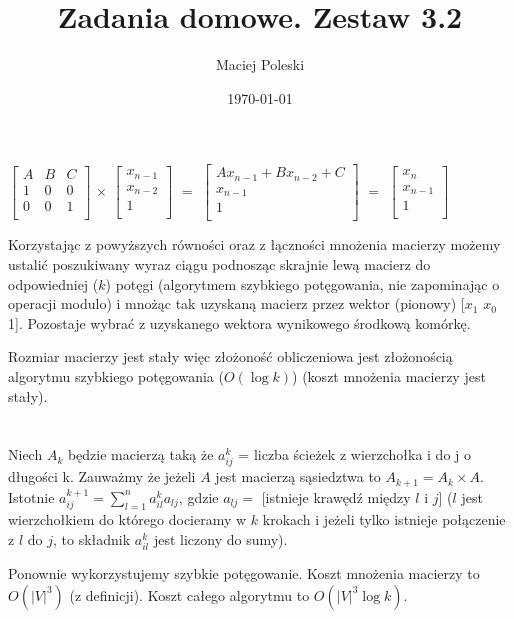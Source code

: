 \documentclass[a4paper,12pt]{article}
\title{Zadania domowe. Zestaw 3.2}
\author{Maciej Poleski}
\date{\today}
\begin{document}
\maketitle

\newpage

\section{}
$
\begin{bmatrix}
 A & B & C \\
 1 & 0 & 0 \\
 0 & 0 & 1 \\
\end{bmatrix}
$
$\times$
$
\begin{bmatrix}
 x_{n-1} \\
 x_{n-2} \\
 1 \\
\end{bmatrix}
$
$=$
$
\begin{bmatrix}
 Ax_{n-1}+Bx_{n-2}+C \\
 x_{n-1} \\
 1 \\
\end{bmatrix}
$
$=$
$
\begin{bmatrix}
 x_{n} \\
 x_{n-1} \\
 1 \\
\end{bmatrix}
$


Korzystając z powyższych równości oraz z łączności mnożenia macierzy możemy ustalić poszukiwany wyraz ciągu podnosząc skrajnie lewą macierz do odpowiedniej ($k$) potęgi (algorytmem szybkiego potęgowania, nie zapominając o operacji modulo) i mnożąc tak uzyskaną macierz przez wektor (pionowy) [$x_1$ $x_0$ 1]. Pozostaje wybrać z uzyskanego wektora wynikowego środkową komórkę.

Rozmiar macierzy jest stały więc złożoność obliczeniowa jest złożonością algorytmu szybkiego potęgowania ($O(\log{k})$) (koszt mnożenia macierzy jest stały).

\section{}
Niech $A_k$ będzie macierzą taką że $a_{ij}^k$ = liczba ścieżek z wierzchołka i do j o długości k. Zauważmy że jeżeli $A$ jest macierzą sąsiedztwa to $A_{k+1} = A_k \times A$. Istotnie $a_{ij}^{k+1} = \sum_{l=1}^n a_{il}^{k}a_{lj}$, gdzie $a_{lj} = $ [istnieje krawędź między $l$ i $j$] ($l$ jest wierzchołkiem do którego docieramy w $k$ krokach i jeżeli tylko istnieje połączenie z $l$ do $j$, to składnik $a_{il}^k$ jest liczony do sumy).

Ponownie wykorzystujemy szybkie potęgowanie. Koszt mnożenia macierzy to $O(|V|^3)$ (z definicji). Koszt całego algorytmu to $O(|V|^3\log{k})$.
\end{document}
